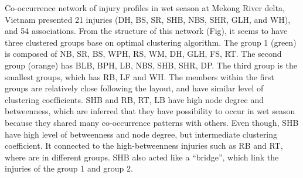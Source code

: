 Co-occurrence network of injury profiles in wet season at Mekong River delta, Vietnam presented 21 injuries (DH, BS, SR, SHB, NBS, SHR, GLH, and WH), and 54 associations. From the structure of this network (Fig), it seems to have three clustered groups base on optimal clustering algorithm. The group 1 (green) is composed of NB, SR, BS, WPH, RS, WM, DH, GLH, FS, RT. The second group (orange) has BLB, BPH, LB, NBS, SHB, SHR, DP. The third group is the smallest groups, which has RB, LF and WH. The members within the first groups are relatively close following the layout, and have similar level of clustering coefficients. SHB and RB, RT, LB have high node degree and betweenness, which are inferred that they have possibility to occur in wet season because they shared many co-occurrence patterns with others. Even though, SHB have high level of betweenness and node degree, but intermediate clustering coefficient.  It connected to the high-betweenness injuries such as RB and RT, where are in different groups. SHB also acted like a ``bridge'', which link the injuries of the group 1 and group 2.

%
%

